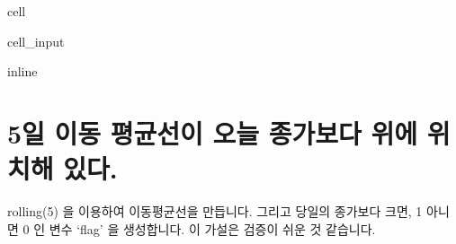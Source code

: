 \documentclass[letterpaper,10pt,english]{jupyterBook}
\begin{document}
\begin{sphinxuseclass}{cell}\begin{sphinxVerbatimInput}

\begin{sphinxuseclass}{cell_input}
\begin{sphinxVerbatim}[commandchars=\\\{\}]
   
 inline
   
   
   
 

  
\end{sphinxVerbatim}

\end{sphinxuseclass}\end{sphinxVerbatimInput}

\end{sphinxuseclass}

\part{5일 이동 평균선이 오늘 종가보다 위에 위치해 있다.}
\label{\detokenize{chapter5/5.1.2_Hypothesis_2:id1}}\label{\detokenize{chapter5/5.1.2_Hypothesis_2::doc}}
\sphinxAtStartPar
rolling(5) 을 이용하여 이동평균선을 만듭니다. 그리고 당일의 종가보다 크면, 1 아니면 0 인 변수 ‘flag’ 을 생성합니다. 이 가설은 검증이 쉬운 것 같습니다.
\end{document}

